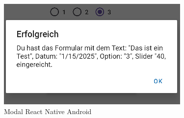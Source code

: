 \begin{figure}[H]
    \begin{minipage}{0.45\textwidth}
        \centering
        \includegraphics[width=\linewidth]{images/form/android/react_native/modal.png}
        \caption{Modal React Native Android}
    \end{minipage}
    \hfill
    \begin{minipage}{0.45\textwidth}
        \centering

\end{minipage}
\end{figure}
